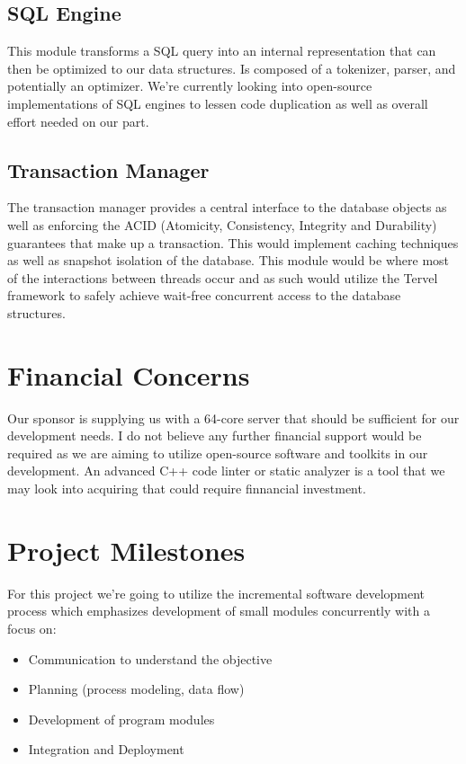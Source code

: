 \documentclass[letterpaper]{article}
\begin{document}
  \subsection{SQL Engine}
  This module transforms a SQL query into an internal representation that can then be optimized to our data structures. Is composed of a tokenizer,
  parser, and potentially an optimizer. We're currently looking into open-source implementations of SQL engines to lessen code duplication as well
  as overall effort needed on our part.
  
  \subsection{Transaction Manager}
  The transaction manager provides a central interface to the database objects as well as enforcing the ACID (Atomicity, Consistency, Integrity
  and Durability) guarantees that make up a transaction. This would implement caching techniques as well as snapshot isolation of the
  database. This module would be where most of the interactions between threads occur and as such would utilize the Tervel framework to 
  safely achieve wait-free concurrent access to the database structures.
  
  \section{Financial Concerns}
  Our sponsor is supplying us with a 64-core server that should be sufficient for our development needs. I do not believe any further financial
  support would be required as we are aiming to utilize open-source software and toolkits in our development. An advanced C++ code linter or static
  analyzer is a tool that we may look into acquiring that could require finnancial investment.
  
  \pagebreak
  \section{Project Milestones}
  For this project we're going to utilize the incremental software development process which emphasizes development of small modules concurrently
  with a focus on:
  \begin{itemize}
   \item Communication to understand the objective
   \item Planning (process modeling, data flow)
   \item Development of program modules
   \item Integration and Deployment
  \end{itemize}
\end{document}
